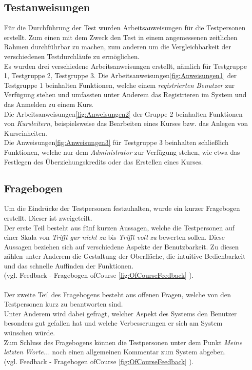 \subsection{Testanweisungen}
Für die Durchführung der Test wurden Arbeitsanweisungen für die Testpersonen erstellt. Zum einen mit dem Zweck den Test in einem angemessenen zeitlichen Rahmen durchführbar zu machen, zum anderen um die Vergleichbarkeit der verschiedenen Testdurchläufe zu ermöglichen.\ \\
Es wurden drei verschiedene Arbeitsanweisungen erstellt, nämlich für Testgruppe 1, Testgruppe 2, Testgruppe 3. Die Arbeitsanweisungen\ref{fig:Anweisungen1} der Testgruppe 1 beinhalten Funktionen, welche einem {\it registrierten Benutzer} zur Verfügung stehen und umfassten unter Anderem das Registrieren im System und das Anmelden zu einem Kurs.\\
Die Arbeitsanweisungen\ref{fig:Anweisungen2} der Gruppe 2  beinhalten Funktionen von {\it Kursleitern}, beispielsweise das Bearbeiten eines Kurses bzw. das Anlegen von Kurseinheiten.\\
Die Anweisungen\ref{fig:Anweisungen3} für Testgruppe 3 beinhalten schließlich Funktionen, welche nur dem {\it Administrator} zur Verfügung stehen, wie etwa das Festlegen des Überziehungskredits oder das Erstellen eines Kurses.
\subsection{Fragebogen}
Um die Eindrücke der Testpersonen festzuhalten, wurde ein kurzer Fragebogen erstellt. Dieser ist zweigeteilt. \\
Der erste Teil besteht aus fünf kurzen Aussagen, welche die Testpersonen auf einer Skala von {\it Trifft gar nicht zu} bis 
{\it Trifft voll zu} bewerten sollen. Diese Aussagen beziehen sich auf verschiedene Aspekte der Benutzbarkeit.
Zu diesen zählen unter Anderem die Gestaltung der Oberfläche, die intuitive Bedienbarkeit und das schnelle Auffinden der Funktionen.\\
(vgl. Feedback - Fragebogen ofCourse \ref{fig:OfCourseFeedback} ).\ \\
\ \\
Der zweite Teil des Fragebogens besteht aus offenen Fragen, welche von den Testpersonen kurz zu beantworten sind.\\
Unter Anderem wird dabei gefragt, welcher Aspekt des Systems den Benutzer besonders gut gefallen hat und welche Verbesserungen er sich am System wünschen würde.\\
Zum Schluss des Fragebogens können die Testpersonen unter dem Punkt {\it Meine letzten Worte...} noch einen allgemeinen Kommentar zum System abgeben. \\
(vgl. Feedback - Fragebogen ofCourse \ref{fig:OfCourseFeedback} ).\ \\


